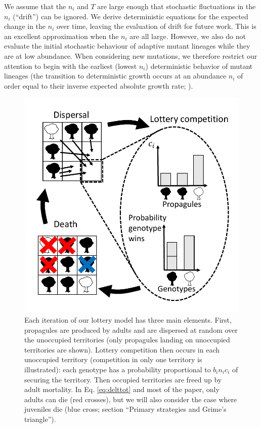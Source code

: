 \documentclass[11pt]{article}
\begin{document}
We assume that the $n_i$ and $T$ are large enough that stochastic fluctuations in the $n_i$ (``drift'') can be ignored. We derive deterministic equations for the expected change in the $n_i$ over time, leaving the evaluation of drift for future work. This is an excellent approximation when the $n_i$ are all large. However, we also do not evaluate the initial stochastic behaviour of adaptive mutant lineages while they are at low abundance. When considering new mutations, we therefore restrict our attention to begin with the earliest (lowest $n_i$) deterministic behavior of mutant lineages (the transition to deterministic growth occurs at an abundance $n_i$ of order equal to their inverse expected absolute growth rate; \citealt{uecker_2011}).

\begin{figure}
\centering
\includegraphics[scale=0.8]{lottery.pdf}
\caption{\label{fig:lottery} Each iteration of our lottery model has three main elements. First, propagules are produced by adults and are dispersed at random over the unoccupied territories (only propagules landing on unoccupied territories are shown). Lottery competition then occurs in each unoccupied territory (competition in only one territory is illustrated): each genotype has a probability proportional to $b_i n_i c_i$ of securing the territory. Then occupied territories are freed up by adult mortality. In Eq. \eqref{eq:delttot} and most of the paper, only adults can die (red crosses), but we will also consider the case where juveniles die (blue cross; section ``Primary strategies and Grime's triangle'').}
\end{figure}
\end{document}

